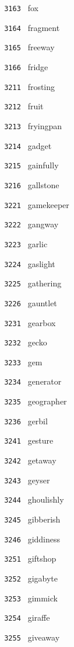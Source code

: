 \documentclass[11pt]{article}
\begin{document}
\begin{multicols}{6}
\noindent \texttt{ 3163 } fox  \par
\noindent \texttt{ 3164 } fragment  \par
\noindent \texttt{ 3165 } freeway  \par
\noindent \texttt{ 3166 } fridge  \par
\noindent \texttt{ 3211 } frosting  \par
\noindent \texttt{ 3212 } fruit  \par
\noindent \texttt{ 3213 } fryingpan  \par
\noindent \texttt{ 3214 } gadget  \par
\noindent \texttt{ 3215 } gainfully  \par
\noindent \texttt{ 3216 } gallstone  \par
\noindent \texttt{ 3221 } gamekeeper  \par
\noindent \texttt{ 3222 } gangway  \par
\noindent \texttt{ 3223 } garlic  \par
\noindent \texttt{ 3224 } gaslight  \par
\noindent \texttt{ 3225 } gathering  \par
\noindent \texttt{ 3226 } gauntlet  \par
\noindent \texttt{ 3231 } gearbox  \par
\noindent \texttt{ 3232 } gecko  \par
\noindent \texttt{ 3233 } gem  \par
\noindent \texttt{ 3234 } generator  \par
\noindent \texttt{ 3235 } geographer  \par
\noindent \texttt{ 3236 } gerbil  \par
\noindent \texttt{ 3241 } gesture  \par
\noindent \texttt{ 3242 } getaway  \par
\noindent \texttt{ 3243 } geyser  \par
\noindent \texttt{ 3244 } ghoulishly  \par
\noindent \texttt{ 3245 } gibberish  \par
\noindent \texttt{ 3246 } giddiness  \par
\noindent \texttt{ 3251 } giftshop  \par
\noindent \texttt{ 3252 } gigabyte  \par
\noindent \texttt{ 3253 } gimmick  \par
\noindent \texttt{ 3254 } giraffe  \par
\noindent \texttt{ 3255 } giveaway  \par

\end{multicols}
\end{document}
